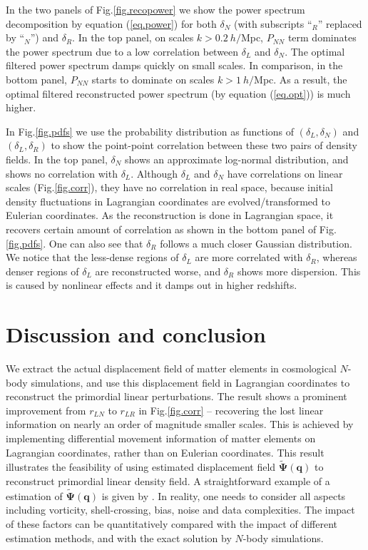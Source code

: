 \documentclass[aps,prd,twocolumn,superscriptaddress,amsfont,amssymb,amsmath,nofootinbib,showpacs,balancelastpage]{revtex4-1}
\newcommand{\bs}{\boldsymbol}
\newcommand{\tcr}{\textcolor{red}}
\begin{document}
In the two panels of Fig.\ref{fig.recopower} we show the power spectrum
decomposition by equation (\ref{eq.power}) for both $\delta_N$ 
(with subscripts ``$_R$'' replaced by ``$_N$'') and $\delta_R$.
In the top panel, on scales $k>0.2\ h/$Mpc,
$P_{NN}$ term dominates the power spectrum due to a low correlation
between $\delta_L$ and $\delta_N$. The optimal filtered power spectrum
damps quickly on small scales. In comparison, in the bottom panel,
$P_{NN}$ starts to dominate on scales $k>1\ h/$Mpc. As a result, the
optimal filtered reconstructed power spectrum
(by equation (\ref{eq.opt})) is much higher.

In Fig.\ref{fig.pdfs} we use the probability distribution
as functions of $(\delta_L,\delta_N)$ and $(\delta_L,\delta_R)$
to show the point-point correlation between these two pairs of density
fields. In the top panel, $\delta_N$ shows an approximate log-normal
distribution, and shows no correlation with $\delta_L$. Although
$\delta_L$ and $\delta_N$ have correlations on linear scales (Fig.\ref{fig.corr}),
they have no correlation in real space, because initial density fluctuations
in Lagrangian coordinates are evolved/transformed to Eulerian coordinates.
As the reconstruction is done in Lagrangian space, it recovers
certain amount of correlation as shown in the bottom panel
of Fig.\ref{fig.pdfs}. One can also see that $\delta_R$ follows
a much closer Gaussian distribution.
We notice that the less-dense regions of $\delta_L$ are more
correlated with $\delta_R$, whereas denser regions of $\delta_L$ are
reconstructed worse, and $\delta_R$ shows more dispersion.
This is caused by nonlinear effects and it damps out in
higher redshifts.

\section{Discussion and conclusion}\label{sec.discussion}
We extract the actual displacement field of matter elements in cosmological $N$-body
simulations, and use this displacement field in Lagrangian coordinates to reconstruct
the primordial linear perturbations. The result shows a prominent improvement from
$r_{LN}$ to $r_{LR}$ in Fig.\ref{fig.corr} -- recovering the lost linear information on
nearly an order of magnitude smaller scales.
This is achieved by implementing differential movement information
of matter elements on Lagrangian coordinates, rather than on
Eulerian coordinates. This result illustrates the feasibility
of using estimated displacement field $\tilde{\bs \Psi}(\bs q)$ to reconstruct primordial linear
density field. A straightforward example of a estimation of $\tilde{\bs \Psi}(\bs q)$
is given by \cite{1995ApJS..100..269P,1998ApJS..115...19P}.
In reality, one needs
to consider all aspects including vorticity, shell-crossing, bias, noise
and data complexities. The impact of these factors can be quantitatively
compared with the impact of different estimation methods, and with
the exact solution by $N$-body simulations.
\end{document}

